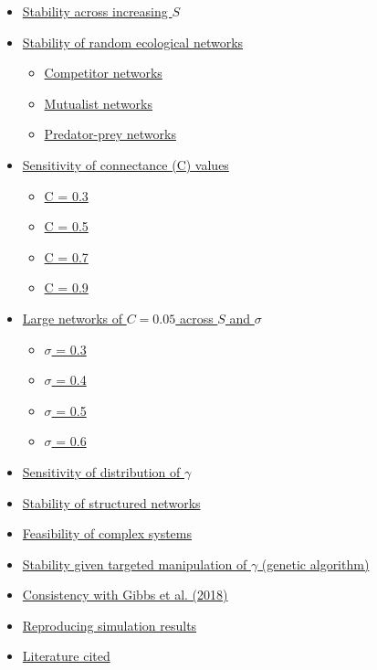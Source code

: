 \documentclass[]{article}
\providecommand{\tightlist}{%
  \setlength{\itemsep}{0pt}\setlength{\parskip}{0pt}}
\begin{document}
\begin{itemize}
\tightlist
\item
  \protect\hyperlink{IncrS}{Stability across increasing \(S\)}
\item
  \protect\hyperlink{ecological}{Stability of random ecological
  networks}

  \begin{itemize}
  \tightlist
  \item
    \protect\hyperlink{competition}{Competitor networks}
  \item
    \protect\hyperlink{mutualism}{Mutualist networks}
  \item
    \protect\hyperlink{pred-prey}{Predator-prey networks}
  \end{itemize}
\item
  \protect\hyperlink{connectance}{Sensitivity of connectance (C) values}

  \begin{itemize}
  \tightlist
  \item
    \protect\hyperlink{connect3}{C = 0.3}
  \item
    \protect\hyperlink{connect5}{C = 0.5}
  \item
    \protect\hyperlink{connect7}{C = 0.7}
  \item
    \protect\hyperlink{connect9}{C = 0.9}
  \end{itemize}
\item
  \protect\hyperlink{sigma}{Large networks of \(C = 0.05\) across \(S\)
  and \(\sigma\)}

  \begin{itemize}
  \tightlist
  \item
    \protect\hyperlink{sigma3}{\(\sigma\) = 0.3}
  \item
    \protect\hyperlink{sigma4}{\(\sigma\) = 0.4}
  \item
    \protect\hyperlink{sigma5}{\(\sigma\) = 0.5}
  \item
    \protect\hyperlink{sigma6}{\(\sigma\) = 0.6}
  \end{itemize}
\item
  \protect\hyperlink{gam_dist}{Sensitivity of distribution of
  \(\gamma\)}
\item
  \protect\hyperlink{structured}{Stability of structured networks}
\item
  \protect\hyperlink{Feasibility}{Feasibility of complex systems}
\item
  \protect\hyperlink{ga}{Stability given targeted manipulation of
  \(\gamma\) (genetic algorithm)}
\item
  \protect\hyperlink{Gibbs}{Consistency with Gibbs et al. (2018)}
\item
  \protect\hyperlink{repr}{Reproducing simulation results}
\item
  \protect\hyperlink{ref}{Literature cited}
\end{itemize}
\end{document}
